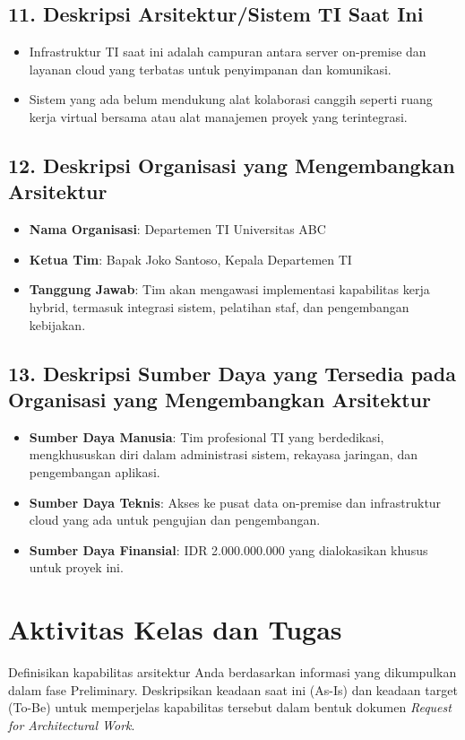 \subsection*{11. Deskripsi Arsitektur/Sistem TI Saat Ini}
\begin{itemize}
	\item Infrastruktur TI saat ini adalah campuran antara server on-premise dan layanan cloud yang terbatas untuk penyimpanan dan komunikasi.
	\item Sistem yang ada belum mendukung alat kolaborasi canggih seperti ruang kerja virtual bersama atau alat manajemen proyek yang terintegrasi.
\end{itemize}

\subsection*{12. Deskripsi Organisasi yang Mengembangkan Arsitektur}
\begin{itemize}
	\item \textbf{Nama Organisasi}: Departemen TI Universitas ABC
	\item \textbf{Ketua Tim}: Bapak Joko Santoso, Kepala Departemen TI
	\item \textbf{Tanggung Jawab}: Tim akan mengawasi implementasi kapabilitas kerja hybrid, termasuk integrasi sistem, pelatihan staf, dan pengembangan kebijakan.
\end{itemize}

\subsection*{13. Deskripsi Sumber Daya yang Tersedia pada Organisasi yang Mengembangkan Arsitektur}
\begin{itemize}
	\item \textbf{Sumber Daya Manusia}: Tim profesional TI yang berdedikasi, mengkhususkan diri dalam administrasi sistem, rekayasa jaringan, dan pengembangan aplikasi.
	\item \textbf{Sumber Daya Teknis}: Akses ke pusat data on-premise dan infrastruktur cloud yang ada untuk pengujian dan pengembangan.
	\item \textbf{Sumber Daya Finansial}: IDR 2.000.000.000 yang dialokasikan khusus untuk proyek ini.
\end{itemize}


\section{Aktivitas Kelas dan Tugas}
 Definisikan kapabilitas arsitektur Anda berdasarkan informasi yang dikumpulkan dalam fase Preliminary. Deskripsikan keadaan saat ini (As-Is) dan keadaan target (To-Be) untuk memperjelas kapabilitas tersebut dalam bentuk dokumen \textit{Request for Architectural Work}.